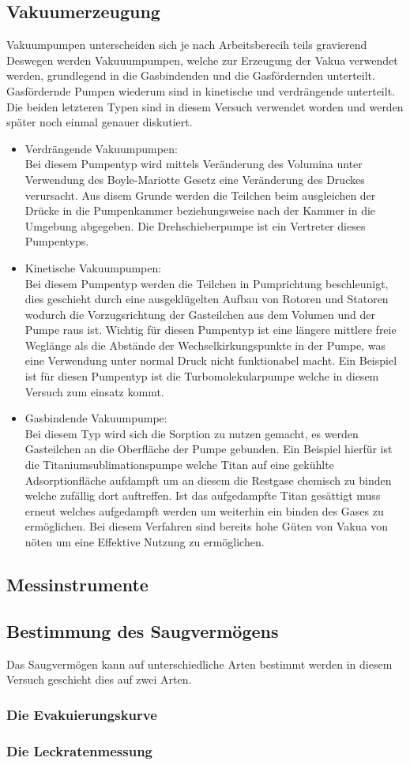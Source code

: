 \subsection{Vakuumerzeugung}
Vakuumpumpen unterscheiden sich je nach Arbeitsberecih teils gravierend 
Deswegen werden Vakuuumpumpen, welche zur Erzeugung der Vakua verwendet werden, grundlegend in die Gasbindenden und die Gasfördernden unterteilt. 
Gasfördernde Pumpen wiederum sind in kinetische und verdrängende unterteilt. Die beiden letzteren Typen sind in diesem Versuch verwendet worden 
und werden später noch einmal genauer diskutiert.
\begin{itemize}
    \item Verdrängende Vakuumpumpen:\\
    Bei diesem Pumpentyp wird mittels Veränderung des Volumina unter Verwendung des Boyle-Mariotte Gesetz eine Veränderung des Druckes 
    verursacht. Aus disem Grunde werden die Teilchen beim ausgleichen der Drücke in die Pumpenkammer beziehungsweise nach der Kammer 
    in die Umgebung abgegeben. Die Drehschieberpumpe ist ein Vertreter dieses Pumpentyps.


    \item Kinetische Vakuumpumpen:\\
    Bei diesem Pumpentyp werden die Teilchen in Pumprichtung beschleunigt, dies geschieht durch eine ausgeklügelten Aufbau von Rotoren 
    und Statoren wodurch die Vorzugsrichtung der Gasteilchen aus dem Volumen und der Pumpe raus ist. Wichtig für diesen Pumpentyp 
    ist eine längere mittlere freie Weglänge als die Abstände der Wechselkirkungspunkte in der Pumpe, was eine Verwendung unter normal 
    Druck nicht funktionabel macht. Ein Beispiel ist für diesen Pumpentyp ist die Turbomolekularpumpe welche in diesem Versuch zum einsatz kommt.

    \item Gasbindende Vakuumpumpe:\\
    Bei diesem Typ wird sich die Sorption zu nutzen gemacht, es werden Gasteilchen an die Oberfläche der Pumpe gebunden. Ein Beispiel 
    hierfür ist die Titaniumsublimationspumpe welche Titan auf eine gekühlte Adsorptionfläche aufdampft um an diesem die Restgase chemisch 
    zu binden welche zufällig dort auftreffen. Ist das aufgedampfte Titan gesättigt muss erneut welches aufgedampft werden um weiterhin ein binden 
    des Gases zu ermöglichen. Bei diesem Verfahren sind bereits hohe Güten von Vakua von nöten um eine Effektive Nutzung zu ermöglichen.
\end{itemize}

\subsection{Messinstrumente}

\subsection{Bestimmung des Saugvermögens}
Das Saugvermögen kann auf unterschiedliche Arten bestimmt werden in diesem Versuch geschieht dies auf zwei Arten.
\subsubsection{Die Evakuierungskurve}

\subsubsection{Die Leckratenmessung}


